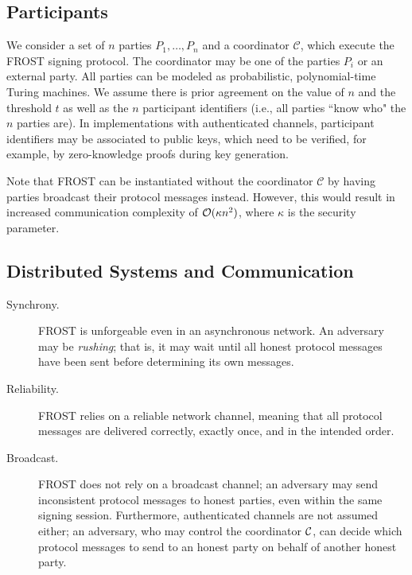 \subsection{Participants}
We consider a set of $n$ parties
$P_1, \dots, P_n$ and a coordinator $\mathcal{C}$, which execute the FROST signing protocol.
The coordinator may be one of the parties $P_i$ or an external party.
All parties can be modeled as probabilistic, polynomial-time Turing machines.
We assume there is prior agreement on the value of $n$ and the threshold $t$ as well as the $n$ participant identifiers (i.e., all parties ``know who" the $n$ parties are).
In implementations with authenticated channels, participant identifiers may be associated to public keys, which need to be verified, for example, by zero-knowledge proofs during key generation.

Note that FROST can be instantiated without the coordinator $\mathcal{C}$ by having parties broadcast their protocol messages instead.  However, this would result in increased communication complexity of $\mathcal{O}(\kappa n^2)$, where $\kappa$ is the security parameter.

\subsection{Distributed Systems and Communication}

\begin{description}

\item[Synchrony.] FROST is unforgeable even in an asynchronous network. An adversary may be \emph{rushing}; that is, it may wait until all honest protocol messages have been sent before determining its own messages.

\item[Reliability.] FROST relies on a reliable network channel, meaning that all protocol messages are delivered correctly, exactly once, and in the intended order.  

\item[Broadcast.] FROST does not rely on a broadcast channel; an adversary may send inconsistent protocol messages to honest parties, even within the same signing session.  Furthermore, authenticated channels are not assumed either; an adversary, who may control the coordinator $\mathcal{C}$, can decide which protocol messages to send to an honest party on behalf of another honest party.

\end{description}

